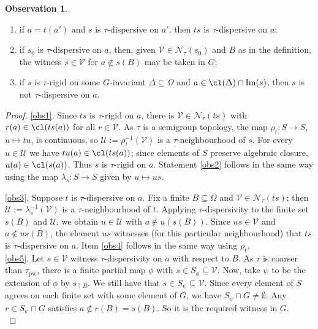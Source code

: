 \documentclass{article}
\theoremstyle{remark}
\theoremstyle{definition}
\newtheorem{observation}[theorem]{Observation}
\newcommand{\U}[0]{\mathbb{U}}
\newcommand{\nn}[0]{S}%
\renewcommand{\U}[0]{\mathcal{U}}
\newcommand{\V}[0]{\mathcal{V}}
\DeclareMathOperator{\im}{Im}
\newcommand{\pw}[0]{\tau_{\mathrm{pw}}}
\begin{document}
{{{{{\begin{observation}
\begin{enumerate}
      \item \label{obs4} {if $a=t(a')$ and $s$ is $\tau$-dispersive on $a'$, then $ts$ is $\tau$-dispersive on $a$;}
       
      \item \label{obs5}
      if $s_0$ is $\tau$-dispersive on $a$, then, given $\V \in \mathcal{N}_\tau(s_0)$
      and $B$ as in the definition, the witness $s \in \V$ for $a \notin s(B)$ may be taken in $G$;
      \item \label{obs6} if $s$ is $\tau$-rigid on some $G$-invariant $\Delta\subseteq\Omega$ and $a\in\cl(\Delta)\cap\im(s)$, then $s$ is not $\tau$-dispersive on $a$.  
     \end{enumerate}    
  \end{observation}
  \begin{proof}
   \eqref{obs1}. Since $ts$ is $\tau$-rigid on $a$, there is $\V \in \mathcal{N}_\tau(ts)$   with $r(a) \in \cl(ts(a))$ for all $r \in \V$. As $\tau$ is a semigroup topology, the map $\rho_t \colon S \to S$, $u \mapsto tu$, is continuous, so $\U := \rho_t^{-1}(\V)$ is a $\tau$-neighbourhood of $s$. For every $u \in \U$ we have $tu(a) \in \cl(ts(a))$; since elements of $S$ preserve algebraic closure, $u(a) \in \cl(s(a))$. Thus $s$ is $\tau$-rigid on $a$.
  Statement \eqref{obs2} follows in the same way using the map $\lambda_s:S\to S$ given by $u\mapsto us$.


\eqref{obs3}. Suppose $t$ is $\tau$-dispersive on $a$. Fix a finite $B \subseteq \Omega$ and
  $\V \in \mathcal{N}_\tau(ts)$; then $\U := \lambda_s^{-1}(\V)$ is a $\tau$-neighbourhood of $t$. Applying $\tau$-dispersivity to the finite set $s(B)$ and $\U$, we obtain $u \in \U$ with  $a \notin u(s(B))$. Since $us \in \V$ and $a \notin us(B)$, the element $us$ witnesses ({for this particular neighbourhood}) that  $ts$ is $\tau$-dispersive on $a$. Item \eqref{obs4} follows in the same way using $\rho_t$.\\


     \eqref{obs5}. Let $s\in\V$ witness $\tau$-dispersivity on $a$ with respect to $B$. As $\tau$ is coarser than $\pw$,  there is {a finite partial map $\phi$}
     with $s \in \nn_\phi \subseteq \V$. Now, take $\psi$ to be the extension of $\phi$ by $s_{\upharpoonright B}$. We still have that $s\in \nn_{\psi}\subseteq\V$. Since every element of $S$ agrees on each finite set with some element of $G$, we have  $\nn_\psi \cap G \neq \emptyset$. Any $r \in \nn_\psi \cap G$ satisfies $a\not\in r(B)=s(B)$.
  So it is the required witness in $G$.\\
     

\end{proof}}}}}}
\end{document}
